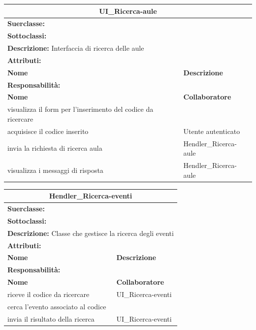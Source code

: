 \documentclass[11pt]{article}
\begin{document}
\begin{table}[H]
\centering
\begin{tabularx}{1\textwidth}{|X|X|}\hline
\multicolumn{2}{|c|}{\textbf{UI\_Ricerca-aule}}\\\hline
\multicolumn{2}{|l|}{\textbf{Suerclasse:}}\\\hline
\multicolumn{2}{|l|}{\textbf{Sottoclassi:}}\\\hline
\multicolumn{2}{|l|}{\textbf{Descrizione:} Interfaccia di ricerca delle aule}\\\hline
\multicolumn{2}{|l|}{\textbf{Attributi:}}\\
\textbf{Nome} & \textbf{Descrizione}\\
\hline
\multicolumn{2}{|l|}{\textbf{Responsabilità:}}\\
\textbf{Nome} & \textbf{Collaboratore}\\
visualizza il form per l'inserimento del codice da ricercare &\\
acquisisce il codice inserito & Utente autenticato\\
invia la richiesta di ricerca aula & Hendler\_Ricerca-aule\\
visualizza i messaggi di risposta & Hendler\_Ricerca-aule\\
\hline
\end{tabularx}
\end{table}


\begin{table}[H]
\centering
\begin{tabularx}{1\textwidth}{|X|X|}\hline
\multicolumn{2}{|c|}{\textbf{Hendler\_Ricerca-eventi}}\\\hline
\multicolumn{2}{|l|}{\textbf{Suerclasse:}}\\\hline
\multicolumn{2}{|l|}{\textbf{Sottoclassi:}}\\\hline
\multicolumn{2}{|l|}{\textbf{Descrizione:} Classe che gestisce la ricerca degli eventi}\\\hline
\multicolumn{2}{|l|}{\textbf{Attributi:}}\\
\textbf{Nome} & \textbf{Descrizione}\\
\hline
\multicolumn{2}{|l|}{\textbf{Responsabilità:}}\\
\textbf{Nome} & \textbf{Collaboratore}\\
riceve il codice da ricercare & UI\_Ricerca-eventi\\ 
cerca l'evento associato al codice &\\
invia il risultato della ricerca & UI\_Ricerca-eventi\\
\hline
\end{tabularx}
\end{table}
\end{document}
